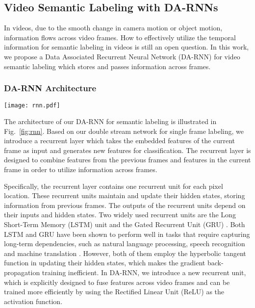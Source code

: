 \documentclass[conference]{IEEEtran}
\begin{document}
\subsection{Video Semantic Labeling with DA-RNNs}

In videos, due to the smooth change in camera motion or object motion, information flows across video frames. How to effectively utilize the temporal information for semantic labeling in videos is still an open question. In this work, we propose a Data Associated Recurrent Neural Network (DA-RNN) for video semantic labeling which stores and passes information across frames.

\subsubsection{DA-RNN Architecture}

\begin{figure*}
	\centering
	\texttt{[image: rnn.pdf]}
	\caption{Architecture of our data associated recurrent neural network for semantic labeling on videos.}
	\label{fig:rnn}
	\vspace{-2mm}
\end{figure*}

The architecture of our DA-RNN for semantic labeling is illustrated in Fig.~\ref{fig:rnn}. Based on our double stream network for single frame labeling, we introduce a recurrent layer which takes the embedded features of the current frame as input and generates new features for classification. The recurrent layer is designed to combine features from the previous frames and features in the current frame in order to utilize information across frames.

Specifically, the recurrent layer contains one recurrent unit for each pixel location. These recurrent units maintain and update their hidden states, storing information from previous frames. The outputs of the recurrent units depend on their inputs and hidden states. Two widely used recurrent units are the Long Short-Term Memory (LSTM) unit \cite{hochreiter1997long} and the Gated Recurrent
Unit (GRU) \cite{cho2014properties}. Both LSTM and GRU have been shown to perform well in tasks that require capturing long-term dependencies, such as natural language processing, speech recognition and machine translation \cite{sundermeyer2012lstm,graves2013hybrid,sutskever2014sequence}. However, both of them employ the hyperbolic tangent function in updating their hidden states, which makes the gradient back-propagation training inefficient. In DA-RNN, we introduce a new recurrent unit, which is explicitly designed to fuse features across video frames and can be trained more efficiently by using the Rectified Linear Unit (ReLU) as the activation function.
\end{document}
